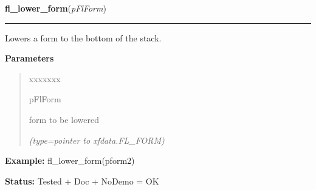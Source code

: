 \hspace{.8\funcindent}\begin{boxedminipage}{\funcwidth}

    \raggedright \textbf{fl\_lower\_form}(\textit{pFlForm})

    \vspace{-1.5ex}

    \rule{\textwidth}{0.5\fboxrule}
\setlength{\parskip}{2ex}
    Lowers a form to the bottom of the stack.

\setlength{\parskip}{1ex}
      \textbf{Parameters}
      \vspace{-1ex}

      \begin{quote}
        \begin{Ventry}{xxxxxxx}

          \item[pFlForm]

          form to be lowered

            {\it (type=pointer to xfdata.FL\_FORM)}

        \end{Ventry}

      \end{quote}

\textbf{Example:} fl\_lower\_form(pform2)



\textbf{Status:} Tested + Doc + NoDemo = OK



    \end{boxedminipage}

    \label{xformslib:flxbasic:fl_set_foreground}

    \vspace{0.5ex}

